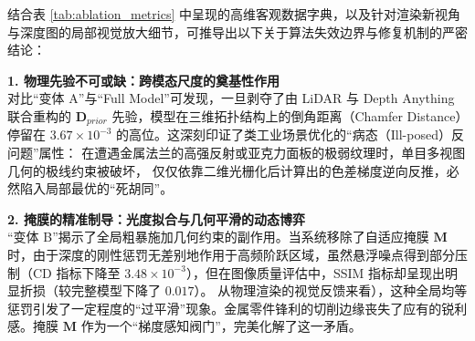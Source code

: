 \begin{table}[htbp]
    \centering
    \caption{多模态自适应几何约束重建算法各核心组件的消融实验性能指标矩阵对比}
    \label{tab:ablation_metrics}
    \renewcommand{\arraystretch}{1.25}
    \setlength{\tabcolsep}{4pt}
    \vspace{0.2cm}
\end{table}

结合表 \ref{tab:ablation_metrics} 中呈现的高维客观数据字典，以及针对渲染新视角与深度图的局部视觉放大细节，可推导出以下关于算法失效边界与修复机制的严密结论：

\textbf{1. 物理先验不可或缺：跨模态尺度的奠基性作用} \\
对比“变体 A”与“Full Model”可发现，一旦剥夺了由 LiDAR 与 Depth Anything 联合重构的 $\bm{D}_{prior}$ 先验，模型在三维拓扑结构上的倒角距离（Chamfer Distance）停留在 $3.67 \times 10^{-3}$ 的高位。这深刻印证了类工业场景优化的“病态（Ill-posed）反问题”属性：
在遭遇金属法兰的高强反射或亚克力面板的极弱纹理时，单目多视图几何的极线约束被破坏，
仅仅依靠二维光栅化后计算出的色差梯度逆向反推，必然陷入局部最优的“死胡同”。

\textbf{2. 掩膜的精准制导：光度拟合与几何平滑的动态博弈} \\
“变体 B”揭示了全局粗暴施加几何约束的副作用。当系统移除了自适应掩膜 $\bm{M}$ 时，由于深度的刚性惩罚无差别地作用于高频阶跃区域，虽然悬浮噪点得到部分压制（CD 指标下降至 $3.48 \times 10^{-3}$），但在图像质量评估中，SSIM 指标却呈现出明显折损（较完整模型下降了 $0.017$）。
从物理渲染的视觉反馈来看），这种全局均等惩罚引发了一定程度的“过平滑”现象。金属零件锋利的切削边缘丧失了应有的锐利感。掩膜 $\bm{M}$ 作为一个“梯度感知阀门”，完美化解了这一矛盾。


